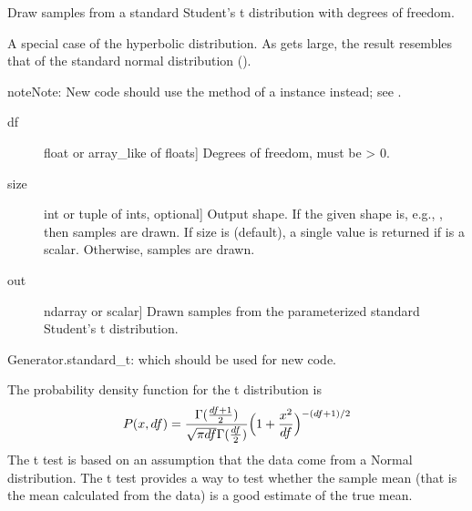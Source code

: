 \documentclass[letterpaper,10pt,english]{sphinxmanual}
\begin{document}
\begin{fulllineitems}
\label{\detokenize{infrapy.utils:infrapy.utils.ref2sac.standard_t}}
Draw samples from a standard Student’s t distribution with  degrees
of freedom.

A special case of the hyperbolic distribution.  As  gets
large, the result resembles that of the standard normal
distribution ().

\begin{sphinxadmonition}{note}{Note:}
New code should use the  method of a 
instance instead; see .
\end{sphinxadmonition}
\begin{description}
\item[{df}] \leavevmode{[}float or array\_like of floats{]}
Degrees of freedom, must be \textgreater{} 0.

\item[{size}] \leavevmode{[}int or tuple of ints, optional{]}
Output shape.  If the given shape is, e.g., , then
 samples are drawn.  If size is  (default),
a single value is returned if  is a scalar.  Otherwise,
 samples are drawn.

\end{description}
\begin{description}
\item[{out}] \leavevmode{[}ndarray or scalar{]}
Drawn samples from the parameterized standard Student’s t distribution.

\end{description}

Generator.standard\_t: which should be used for new code.

The probability density function for the t distribution is
\begin{equation*}
\begin{split}P(x, df) = \frac{\Gamma(\frac{df+1}{2})}{\sqrt{\pi df}
\Gamma(\frac{df}{2})}\Bigl( 1+\frac{x^2}{df} \Bigr)^{-(df+1)/2}\end{split}
\end{equation*}
The t test is based on an assumption that the data come from a
Normal distribution. The t test provides a way to test whether
the sample mean (that is the mean calculated from the data) is
a good estimate of the true mean.


\end{fulllineitems}
\end{document}
